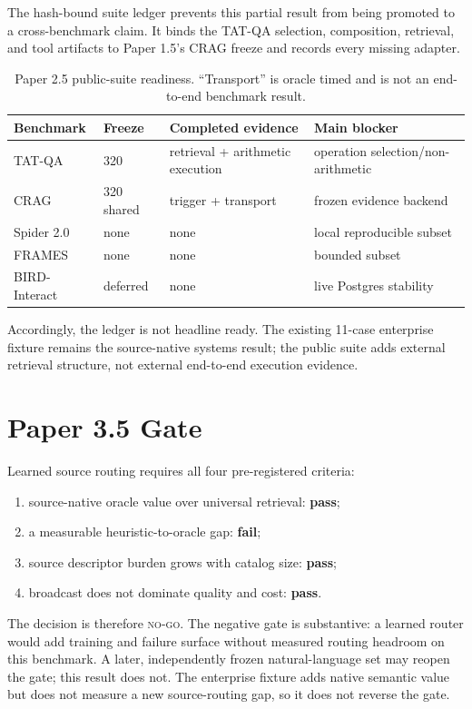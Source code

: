 \documentclass[11pt]{article}
\begin{document}
The hash-bound suite ledger prevents this partial result from being promoted to
a cross-benchmark claim. It binds the TAT-QA selection, composition, retrieval,
and tool artifacts to Paper 1.5's CRAG freeze and records every missing adapter.

\begin{table}[t]
\centering\small
\caption{Paper 2.5 public-suite readiness. ``Transport'' is oracle timed and is
not an end-to-end benchmark result.}
\label{tab:p25-public-readiness}
\begin{tabular}{llll}
\toprule
Benchmark & Freeze & Completed evidence & Main blocker\\
\midrule
TAT-QA & 320 & retrieval + arithmetic execution & operation selection/non-arithmetic\\
CRAG & 320 shared & trigger + transport & frozen evidence backend\\
Spider 2.0 & none & none & local reproducible subset\\
FRAMES & none & none & bounded subset\\
BIRD-Interact & deferred & none & live Postgres stability\\
\bottomrule
\end{tabular}
\end{table}

Accordingly, the ledger is not headline ready. The existing 11-case enterprise
fixture remains the source-native systems result; the public suite adds external
retrieval structure, not external end-to-end execution evidence.

\section{Paper 3.5 Gate}
Learned source routing requires all four pre-registered criteria:
\begin{enumerate}
\item source-native oracle value over universal retrieval: \textbf{pass};
\item a measurable heuristic-to-oracle gap: \textbf{fail};
\item source descriptor burden grows with catalog size: \textbf{pass};
\item broadcast does not dominate quality and cost: \textbf{pass}.
\end{enumerate}
The decision is therefore \textsc{no-go}. The negative gate is substantive: a
learned router would add training and failure surface without measured routing
headroom on this benchmark. A later, independently frozen natural-language set
may reopen the gate; this result does not. The enterprise fixture adds native
semantic value but does not measure a new source-routing gap, so it does not
reverse the gate.
\end{document}
